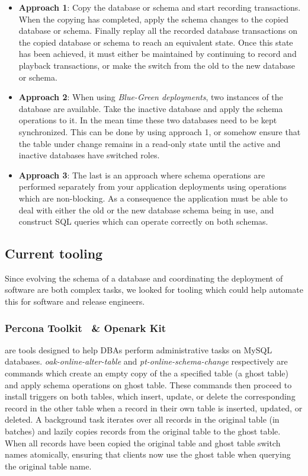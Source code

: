 \documentclass[conference]{IEEEtran}
\begin{document}
\begin{itemize}
  \item{\textbf{Approach 1}: Copy the database or schema and start recording transactions. When the copying has completed, apply the schema changes to the copied database or schema. Finally replay all the recorded database transactions on the copied database or schema to reach an equivalent state. Once this state has been achieved, it must either be maintained by continuing to record and playback transactions, or make the switch from the old to the new database or schema.}
  \item{\textbf{Approach 2}: When using \textit{Blue-Green deployments}, two instances of the database are available. Take the inactive database and apply the schema operations to it. In the mean time these two databases need to be kept synchronized. This can be done by using approach 1, or somehow ensure that the table under change remains in a read-only state until the active and inactive databases have switched roles.}
  \item{\textbf{Approach 3}: The last is an approach where schema operations are performed separately from your application deployments using operations which are non-blocking. As a consequence the application must be able to deal with either the old or the new database schema being in use, and construct SQL queries which can operate correctly on both schemas.}
\end{itemize}

\subsection{Current tooling} 
Since evolving the schema of a database and coordinating the deployment of software are both complex tasks, we looked for tooling which could help automate this for software and release engineers.

\subsubsection{Percona Toolkit~\cite{PerconaToolkit} \& Openark Kit~\cite{OpenarkKit}}
are tools designed to help DBAs perform administrative tasks on MySQL databases. \textit{oak-online-alter-table} and \textit{pt-online-schema-change} respectively are commands which create an empty copy of the a specified table (a ghost table) and apply schema operations on ghost table. These commands then proceed to install triggers on both tables, which insert, update, or delete the corresponding record in the other table when a record in their own table is inserted, updated, or deleted. A background task iterates over all records in the original table (in batches) and lazily copies records from the original table to the ghost table. When all records have been copied the original table and ghost table switch names atomically, ensuring that clients now use the ghost table when querying the original table name.
\end{document}
